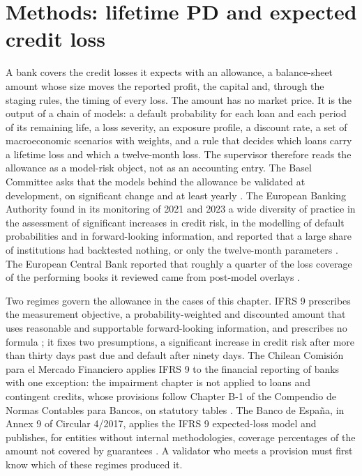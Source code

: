 
\section{Methods: lifetime PD and expected credit loss}
\label{sec:provisions}

A bank covers the credit losses it expects with an allowance, a balance-sheet amount whose size moves the reported profit, the
capital and, through the staging rules, the timing of every loss. The amount has no market price. It is the output of a chain of
models: a default probability for each loan and each period of its remaining life, a loss severity, an exposure profile, a
discount rate, a set of macroeconomic scenarios with weights, and a rule that decides which loans carry a lifetime loss and which
a twelve-month loss. The supervisor therefore reads the allowance as a model-risk object, not as an accounting entry. The Basel
Committee asks that the models behind the allowance be validated at development, on significant change and at least yearly
\citep{provisions:bcbs2015}. The European Banking Authority found in its monitoring of 2021 and 2023 a wide diversity of practice in the
assessment of significant increases in credit risk, in the modelling of default probabilities and in forward-looking information, and
reported that a large share of institutions had backtested nothing, or only the twelve-month parameters
\citep{provisions:eba2021,provisions:eba2023}. The European Central Bank reported that roughly a quarter of the loss coverage of the
performing books it reviewed came from post-model overlays \citep{provisions:ecb2024}.

Two regimes govern the allowance in the cases of this chapter. IFRS 9 prescribes the measurement objective, a probability-weighted
and discounted amount that uses reasonable and supportable forward-looking information, and prescribes no formula
\citep{provisions:ifrs9,provisions:gppc2016}; it fixes two presumptions, a significant increase in credit risk after more than thirty
days past due and default after ninety days. The Chilean Comisi\'on para el Mercado Financiero applies IFRS 9 to the financial reporting of banks
with one exception: the impairment chapter is not applied to loans and contingent credits, whose provisions follow Chapter B-1 of the
Compendio de Normas Contables para Bancos, on statutory tables \citep{provisions:cmfcncb}. The Banco de Espa\~na, in Annex 9 of
Circular 4/2017, applies the IFRS 9 expected-loss model and publishes, for entities without internal methodologies, coverage
percentages of the amount not covered by guarantees \citep{provisions:bde2017,provisions:bde2021}. A validator who meets a provision must first know which of these regimes produced it.


